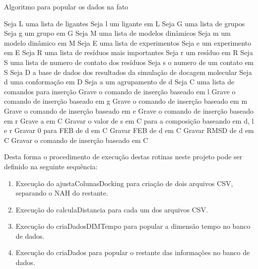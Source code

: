 \begin{algorithm}[H]
\caption{Algoritmo para popular os dados na fato}
\label{alg:criaDadosFato}
{\fontsize{10}{10}\selectfont
\begin{algorithmic}[1]
	\STATE Seja L uma lista de ligantes
	\STATE Seja l um ligante em L
	\STATE Seja G uma lista de grupos
	\STATE Seja g um grupo em G
	\STATE Seja M uma lista de modelos dinâmicos
	\STATE Seja m um modelo dinâmico em M
	\STATE Seja E uma lista de experimentos
	\STATE Seja e um experimento em E
	\STATE Seja R uma lista de resíduos mais importantes
	\STATE Seja r um resíduo em R
	\STATE Seja S uma lista de numero de contato dos resíduos
	\STATE Seja s o numero de um contato em S
	\STATE Seja D a base de dados dos resultados da simulação de docagem molecular
	\STATE Seja d uma conformação em D
	\STATE Seja a um agrupamento de d
	\STATE Seja C uma lista de comandos para inserção
		\STATE Grave o comando de inserção baseado em l
	\ENDFOR
		\STATE Grave o comando de inserção baseado em g
        \ENDFOR
		\STATE Grave o comando de inserção baseado em m
        \ENDFOR
		\STATE Grave o comando de inserção baseado em e
        \ENDFOR
		\STATE Grave o comando de inserção baseado em r
	\ENDFOR
		\STATE Grave a em C
				\STATE Gravar o valor de s em C para a composição baseando em d, l e r
			\ENDFOR
				\STATE Gravar 0 para FEB de d em C
			\ELSE
				\STATE Gravar FEB de d em C
			\ENDIF
			\STATE Gravar RMSD de d em C
			\STATE Gravar o comando de inserção baseado em C
		\ENDFOR
	\ENDFOR
\end{algorithmic}
}
\end{algorithm}

Desta forma o procedimento de execução destas rotinas neste projeto pode ser definido na seguinte sequência:

\begin{enumerate}
    \item Execução do ajustaColunasDocking para criação de dois arquivos CSV, separando o NAH do restante.
    \item Execução do calculaDistancia para cada um dos arquivos CSV.
    \item Execução do criaDadosDIMTempo para popular a dimensão tempo no banco de dados.
    \item Execução do criaDados para popular o restante das informações no banco de dados.
\end{enumerate}

